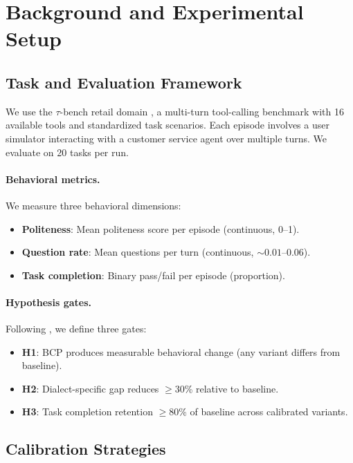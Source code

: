 \documentclass[11pt,a4paper]{article}
\begin{document}
\section{Background and Experimental Setup}

\subsection{Task and Evaluation Framework}

We use the $\tau$-bench retail domain \citep{yao2024taubench}, a multi-turn tool-calling benchmark with 16 available tools and standardized task scenarios. Each episode involves a user simulator interacting with a customer service agent over multiple turns. We evaluate on 20 tasks per run.

\paragraph{Behavioral metrics.} We measure three behavioral dimensions:
\begin{itemize}
    \item \textbf{Politeness}: Mean politeness score per episode (continuous, 0--1).
    \item \textbf{Question rate}: Mean questions per turn (continuous, ${\sim}0.01$--$0.06$).
    \item \textbf{Task completion}: Binary pass/fail per episode (proportion).
\end{itemize}

\paragraph{Hypothesis gates.} Following \citet{sim2real2026gap}, we define three gates:
\begin{itemize}
    \item \textbf{H1}: BCP produces measurable behavioral change (any variant differs from baseline).
    \item \textbf{H2}: Dialect-specific gap reduces $\geq$30\% relative to baseline.
    \item \textbf{H3}: Task completion retention $\geq$80\% of baseline across calibrated variants.
\end{itemize}

\subsection{Calibration Strategies}
\end{document}
